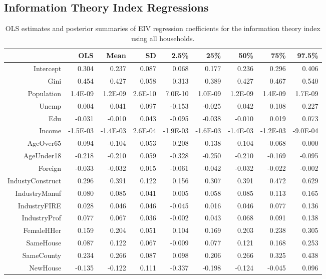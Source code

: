 \documentclass[12pt]{article}
\begin{document}
\clearpage
\subsection{Information Theory Index Regressions}

\begin{table}[ht]
\centering
\begin{tabular}{rrrrrrrrr}
  \hline
 & OLS & Mean & SD & 2.5\% & 25\% & 50\% & 75\% & 97.5\% \\ 
  \hline
  Intercept & 0.304 & 0.237 & 0.087 & 0.068 & 0.177 & 0.236 & 0.296 & 0.406 \\ 
  Gini & 0.454 & 0.427 & 0.058 & 0.313 & 0.389 & 0.427 & 0.467 & 0.540 \\ 
  Population & 1.4E-09 & 1.2E-09 & 2.6E-10 & 7.0E-10 & 1.0E-09 & 1.2E-09 & 1.4E-09 & 1.7E-09 \\ 
  Unemp & 0.004 & 0.041 & 0.097 & -0.153 & -0.025 & 0.042 & 0.108 & 0.227 \\ 
  Edu & -0.031 & -0.010 & 0.043 & -0.095 & -0.038 & -0.010 & 0.019 & 0.073 \\ 
  Income & -1.5E-03 & -1.4E-03 & 2.6E-04 & -1.9E-03 & -1.6E-03 & -1.4E-03 & -1.2E-03 & -9.0E-04 \\ 
  AgeOver65 & -0.094 & -0.104 & 0.053 & -0.208 & -0.138 & -0.104 & -0.068 & -0.000 \\ 
  AgeUnder18 & -0.218 & -0.210 & 0.059 & -0.328 & -0.250 & -0.210 & -0.169 & -0.095 \\ 
  Foreign & -0.033 & -0.032 & 0.015 & -0.061 & -0.042 & -0.032 & -0.022 & -0.002 \\ 
  IndustyConstruct & 0.296 & 0.391 & 0.122 & 0.156 & 0.307 & 0.391 & 0.472 & 0.629 \\ 
  IndustryManuf & 0.080 & 0.085 & 0.041 & 0.005 & 0.058 & 0.085 & 0.113 & 0.165 \\ 
  IndustryFIRE & 0.028 & 0.046 & 0.046 & -0.045 & 0.016 & 0.046 & 0.077 & 0.136 \\ 
  IndustryProf & 0.077 & 0.067 & 0.036 & -0.002 & 0.043 & 0.068 & 0.091 & 0.138 \\ 
  FemaleHHer & 0.159 & 0.204 & 0.051 & 0.104 & 0.169 & 0.203 & 0.238 & 0.305 \\ 
  SameHouse & 0.087 & 0.122 & 0.067 & -0.009 & 0.077 & 0.121 & 0.168 & 0.253 \\ 
  SameCounty & 0.234 & 0.266 & 0.087 & 0.098 & 0.206 & 0.266 & 0.325 & 0.438 \\ 
  NewHouse & -0.135 & -0.122 & 0.111 & -0.337 & -0.198 & -0.124 & -0.045 & 0.096 \\ 
   \hline
\end{tabular}
\caption{OLS estimates and posterior summaries of EIV regression coefficients for the information theory index using all households.}
\label{tab:eiv.hr.raw.all}
\end{table}
\end{document}
